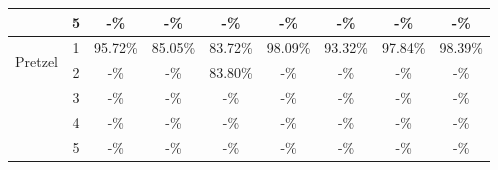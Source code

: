 \begin{table}[h!]
\begin{tabular}{|c|c|ccccccc|}
 & 5 & -\% & -\% & -\% & -\% & -\% & -\% & -\% \\
\hline
\multirow{5}{*}{\begin{sideways}Pretzel\end{sideways}} & 1 & 95.72\% & 85.05\% & 83.72\% & 98.09\% & 93.32\% & 97.84\% & 98.39\% \\
 & 2 & -\% & -\% & 83.80\% & -\% & -\% & -\% & -\% \\
 & 3 & -\% & -\% & -\% & -\% & -\% & -\% & -\% \\
 & 4 & -\% & -\% & -\% & -\% & -\% & -\% & -\% \\
 & 5 & -\% & -\% & -\% & -\% & -\% & -\% & -\% \\
\hline
\end{tabular}
\end{table}